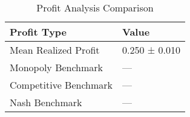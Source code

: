 \begin{table}[htbp]
\centering
\caption{Profit Analysis Comparison}
\label{tab:profits}
\begin{tabular}{ll}
\toprule
Profit Type & Value \\
\midrule
Mean Realized Profit & 0.250 ± 0.010 \\
Monopoly Benchmark & — \\
Competitive Benchmark & — \\
Nash Benchmark & — \\
\bottomrule
\end{tabular}
\end{table}